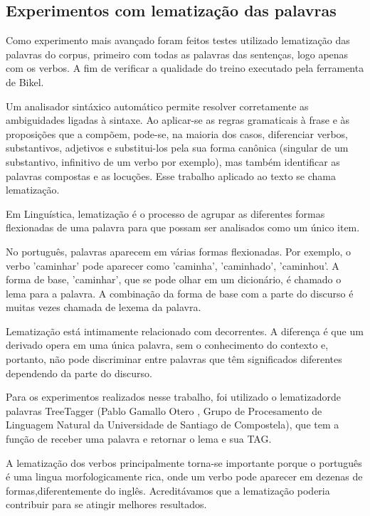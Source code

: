 \subsection{Experimentos com lematização das palavras}
\label{sec:lematizacao}

Como experimento mais avançado foram feitos testes utilizado lematização das palavras do corpus, primeiro com todas as palavras das sentenças, logo apenas com os verbos. A fim de verificar a qualidade do treino executado pela ferramenta de Bikel.

Um analisador sintáxico automático permite resolver corretamente as ambiguidades ligadas à sintaxe. Ao aplicar-se as
regras gramaticais à frase e às proposições que a compõem, pode-se, na maioria dos casos, diferenciar verbos,
substantivos, adjetivos e substitui-los pela sua forma canônica (singular de um substantivo, infinitivo de um verbo por
exemplo), mas também identificar as palavras compostas e as locuções. Esse trabalho aplicado ao texto se chama
lematização.

Em Linguística, lematização é o processo de agrupar as diferentes formas flexionadas de uma palavra para que possam ser analisados como um único item.

No português, palavras aparecem em várias formas flexionadas. Por exemplo, o verbo 'caminhar' pode aparecer como 'caminha', 'caminhado', 'caminhou'. A forma de base, 'caminhar', que se pode olhar em um dicionário, é chamado o lema para a palavra. A combinação da forma de base com a parte do discurso é muitas vezes chamada de lexema da palavra.

Lematização está intimamente relacionado com decorrentes. A diferença é que um derivado opera em uma única palavra, sem o conhecimento do contexto e, portanto, não pode discriminar entre palavras que têm significados diferentes dependendo da parte do discurso.

Para os experimentos realizados nesse trabalho, foi utilizado o lematizadorde palavras TreeTagger (Pablo Gamallo Otero , Grupo de Procesamento de Linguagem Natural da Universidade de Santiago de Compostela), que tem a função de receber uma palavra e retornar o lema e sua TAG.

A lematização dos verbos principalmente torna-se importante porque o português é uma lingua morfologicamente rica, onde um verbo pode aparecer em dezenas de formas,diferentemente do inglês. Acreditávamos que a lematização poderia contribuir para se atingir melhores resultados.




